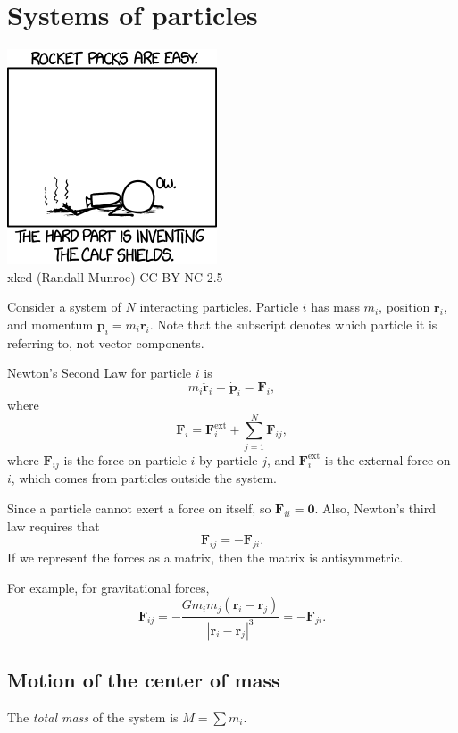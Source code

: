 \documentclass[a4paper]{article}
\begin{document}
\section{Systems of particles}
\begin{center}
  \includegraphics[scale=1]{images/xkcd_rocket_packs.png}\\
  xkcd (Randall Munroe) CC-BY-NC 2.5
\end{center}

Consider a system of $N$ interacting particles. Particle $i$ has mass $m_i$, position $\mathbf{r}_i$, and momentum $\mathbf{p}_i = m_i \dot{\mathbf{r}}_i$. Note that the subscript denotes which particle it is referring to, not vector components.

Newton's Second Law for particle $i$ is
\[
  m_i \ddot{\mathbf{r}}_i = \dot{\mathbf{p}}_i = \mathbf{F}_i,
\]
where
\[
  \mathbf{F}_i = \mathbf{F}_i^{\text{ext}} + \sum_{j = 1}^N \mathbf{F}_{ij},
\]
where $\mathbf{F}_{ij}$ is the force on particle $i$ by particle $j$, and $\mathbf{F}_i^{\text{ext}}$ is the external force on $i$, which comes from particles outside the system.

Since a particle cannot exert a force on itself, so $\mathbf{F}_{ii} = \mathbf{0}$. Also, Newton's third law requires that
\[
  \mathbf{F}_{ij} = -\mathbf{F}_{ji}.
\]
If we represent the forces as a matrix, then the matrix is antisymmetric.

For example, for gravitational forces,
\[
  \mathbf{F}_{ij} = -\frac{Gm_im_j(\mathbf{r}_i - \mathbf{r}_j)}{|\mathbf{r}_i - \mathbf{r}_j|^3} = -\mathbf{F}_{ji}.
\]
\subsection{Motion of the center of mass}
\begin{defi}
  The \emph{total mass} of the system is $M = \sum m_i$.
\end{defi}
\end{document}
